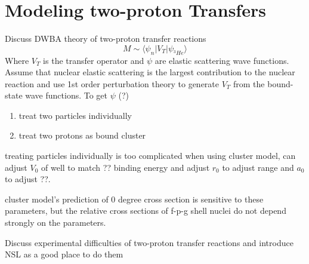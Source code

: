 \section{Modeling two-proton Transfers}
Discuss DWBA theory of two-proton transfer reactions
\begin{equation}
M\sim\langle\psi_n|V_T|\psi_{^3He}\rangle
\end{equation}
Where $V_T$ is the transfer operator and $\psi$ are elastic scattering wave functions.
Assume that nuclear elastic scattering is the largest contribution to the nuclear reaction and use 1st order perturbation theory to generate $V_T$ from the bound-state wave functions.
To get $\psi$ (?)
\begin{enumerate}
\item treat two particles individually
\item treat two protons as bound cluster
\end{enumerate}
treating particles individually is too complicated
when using cluster model, can adjust $V_0$ of well to match ?? binding energy and adjust $r_0$ to adjust range and $a_0$ to adjust ??.

cluster model's prediction of 0 degree cross section is sensitive to these parameters, but the relative cross sections of f-p-g shell nuclei do not depend strongly on the parameters.

Discuss experimental difficulties of two-proton transfer reactions and introduce NSL as a good place to do them

%
% 
% 
